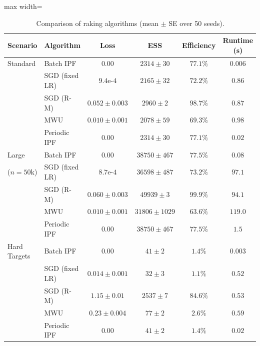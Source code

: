 \begin{table}[t]
\centering
\caption{Comparison of raking algorithms (mean $\pm$ SE over 50 seeds).}
\label{tab:main_results}
\begin{adjustbox}{max width=\textwidth}
\begin{tabular}{llcccc}
\toprule
\textbf{Scenario} & \textbf{Algorithm} & \textbf{Loss} & \textbf{ESS} & \textbf{Efficiency} & \textbf{Runtime (s)} \\
\midrule
Standard & Batch IPF & $0.00$ & $2314 \pm 30$ & $77.1\%$ & $0.006$ \\
 & SGD (fixed LR) & $9.4\text{e-}4$ & $2165 \pm 32$ & $72.2\%$ & $0.86$ \\
 & SGD (R-M) & $0.052 \pm 0.003$ & $2960 \pm 2$ & $98.7\%$ & $0.87$ \\
 & MWU & $0.010 \pm 0.001$ & $2078 \pm 59$ & $69.3\%$ & $0.98$ \\
 & Periodic IPF & $0.00$ & $2314 \pm 30$ & $77.1\%$ & $0.02$ \\
\midrule
Large & Batch IPF & $0.00$ & $38750 \pm 467$ & $77.5\%$ & $0.08$ \\
($n\!=\!50\text{k}$) & SGD (fixed LR) & $8.7\text{e-}4$ & $36598 \pm 487$ & $73.2\%$ & $97.1$ \\
 & SGD (R-M) & $0.060 \pm 0.003$ & $49939 \pm 3$ & $99.9\%$ & $94.1$ \\
 & MWU & $0.010 \pm 0.001$ & $31806 \pm 1029$ & $63.6\%$ & $119.0$ \\
 & Periodic IPF & $0.00$ & $38750 \pm 467$ & $77.5\%$ & $1.5$ \\
\midrule
Hard Targets & Batch IPF & $0.00$ & $41 \pm 2$ & $1.4\%$ & $0.003$ \\
 & SGD (fixed LR) & $0.014 \pm 0.001$ & $32 \pm 3$ & $1.1\%$ & $0.52$ \\
 & SGD (R-M) & $1.15 \pm 0.01$ & $2537 \pm 7$ & $84.6\%$ & $0.53$ \\
 & MWU & $0.23 \pm 0.004$ & $77 \pm 2$ & $2.6\%$ & $0.59$ \\
 & Periodic IPF & $0.00$ & $41 \pm 2$ & $1.4\%$ & $0.02$ \\
\bottomrule
\end{tabular}
\end{adjustbox}
\end{table}
